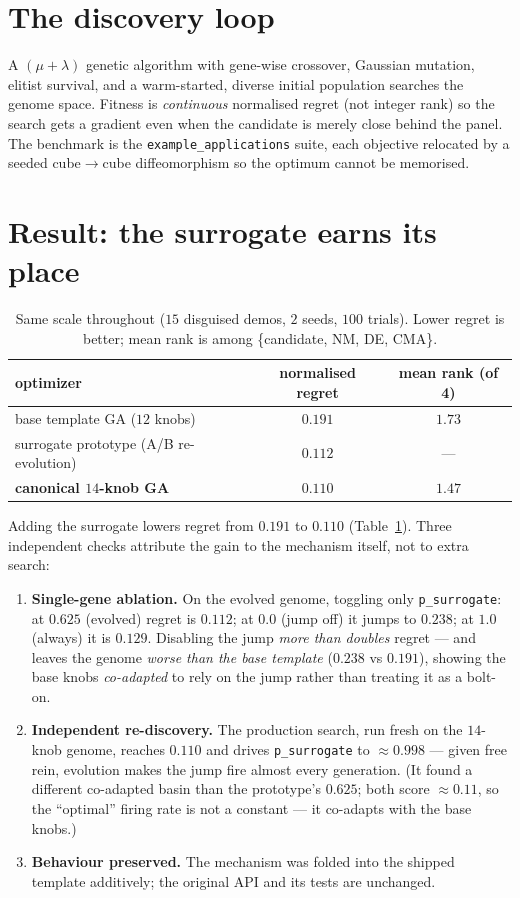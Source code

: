 \documentclass[11pt]{article}
\begin{document}
\section{The discovery loop}

A $(\mu{+}\lambda)$ genetic algorithm with gene-wise crossover, Gaussian mutation,
elitist survival, and a warm-started, diverse initial population searches the genome
space. Fitness is \emph{continuous} normalised regret (not integer rank) so the
search gets a gradient even when the candidate is merely close behind the panel. The
benchmark is the \texttt{example\_applications} suite, each objective relocated by a
seeded cube$\to$cube diffeomorphism so the optimum cannot be memorised.

\section{Result: the surrogate earns its place}

\begin{table}[h]
\centering
\begin{tabular}{lcc}
\toprule
optimizer & normalised regret & mean rank (of 4) \\
\midrule
base template GA ($12$ knobs) & $0.191$ & $1.73$ \\
surrogate prototype (A/B re-evolution) & $0.112$ & --- \\
\textbf{canonical $14$-knob GA} & $\mathbf{0.110}$ & $\mathbf{1.47}$ \\
\bottomrule
\end{tabular}
\caption{Same scale throughout ($15$ disguised demos, $2$ seeds, $100$ trials).
Lower regret is better; mean rank is among \{candidate, NM, DE, CMA\}.}
\label{tab:results}
\end{table}

Adding the surrogate lowers regret from $0.191$ to $0.110$ (Table~\ref{tab:results}).
Three independent checks attribute the gain to the mechanism itself, not to extra
search:
\begin{enumerate}
\item \textbf{Single-gene ablation.} On the evolved genome, toggling only
\texttt{p\_surrogate}: at $0.625$ (evolved) regret is $0.112$; at $0.0$ (jump off) it
jumps to $0.238$; at $1.0$ (always) it is $0.129$. Disabling the jump \emph{more than
doubles} regret --- and leaves the genome \emph{worse than the base template}
($0.238$ vs $0.191$), showing the base knobs \emph{co-adapted} to rely on the jump
rather than treating it as a bolt-on.
\item \textbf{Independent re-discovery.} The production search, run fresh on the
$14$-knob genome, reaches $0.110$ and drives \texttt{p\_surrogate} to $\approx\!0.998$
--- given free rein, evolution makes the jump fire almost every generation. (It found
a different co-adapted basin than the prototype's $0.625$; both score $\approx\!0.11$,
so the ``optimal'' firing rate is not a constant --- it co-adapts with the base knobs.)
\item \textbf{Behaviour preserved.} The mechanism was folded into the shipped
template additively; the original API and its tests are unchanged.
\end{enumerate}
\end{document}
